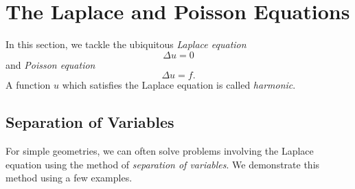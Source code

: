 
\section{The Laplace and Poisson Equations}

In this section, we tackle the ubiquitous \emph{Laplace equation}
\[\Delta u = 0\]
and \emph{Poisson equation}
\[\Delta u = f.\]
A function $u$ which satisfies the Laplace equation is called \emph{harmonic}.

\subsection{Separation of Variables}

For simple geometries, we can often solve problems involving the Laplace equation using the method of \emph{separation of variables}. We demonstrate this method using a few examples.


